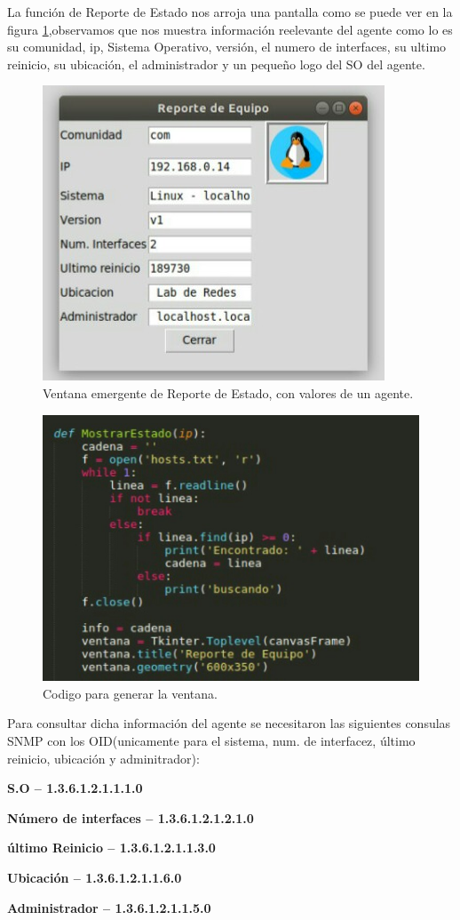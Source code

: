 La función de Reporte de Estado nos arroja una pantalla como se puede ver en la figura \ref{image:Estado},observamos que nos muestra información reelevante del agente como lo es su comunidad, ip, Sistema Operativo, versión, el numero de interfaces, su ultimo reinicio, su ubicación, el administrador y un pequeño logo del SO del agente.

\FloatBarrier
\begin{figure}[htbp!]
		\centering
	\includegraphics[width=.5 \textwidth]{images/Estado}
		\caption{Ventana emergente de Reporte de Estado, con valores de un agente. }		\label{image:Estado}
\end{figure}
\FloatBarrier


\FloatBarrier
\begin{figure}[htbp!]
		\centering
	\includegraphics[width=.4 \textwidth]{images/Info}
		\caption{Codigo para generar la ventana. }		\label{image:Info}
\end{figure}
\FloatBarrier

Para consultar dicha información del agente se necesitaron las siguientes consulas SNMP con los OID(unicamente para el sistema, num. de interfacez, último reinicio, ubicación y adminitrador):


	\textbf{S.O -- 1.3.6.1.2.1.1.1.0}


	\textbf{Número de interfaces -- 1.3.6.1.2.1.2.1.0}


	\textbf{último Reinicio -- 1.3.6.1.2.1.1.3.0}


	\textbf{Ubicación -- 1.3.6.1.2.1.1.6.0}


	\textbf{Administrador -- 1.3.6.1.2.1.1.5.0}
	
